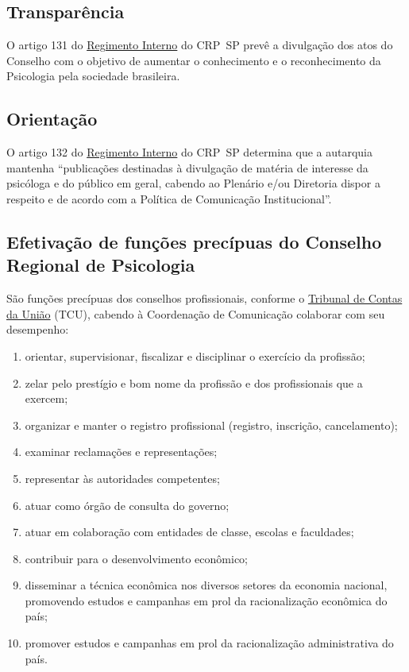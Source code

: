 \subsection{Transparência}

O artigo 131 do
\href{https://correio.crpsp.org.br/service/home/~/?auth=co&loc=pt_BR&id=4201&part=6}{{Regimento
			Interno}} do CRP~SP prevê a divulgação dos atos do Conselho com o
objetivo de aumentar o conhecimento e o reconhecimento da Psicologia
pela sociedade brasileira.

\subsection{Orientação}

O artigo 132 do
\href{https://correio.crpsp.org.br/service/home/~/?auth=co&loc=pt_BR&id=4201&part=6}{{Regimento
			Interno}} do CRP~SP determina que a autarquia mantenha ``publicações
destinadas à divulgação de matéria de interesse da psicóloga e do
público em geral, cabendo ao Plenário e/ou Diretoria dispor a respeito e
de acordo com a Política de Comunicação Institucional''.

\subsection{Efetivação de funções precípuas do Conselho Regional de
	Psicologia}

São funções precípuas dos conselhos profissionais, conforme o
\href{about:blank}{{Tribunal de Contas da União}} (TCU), cabendo à
Coordenação de Comunicação colaborar com seu desempenho:

\begin{enumerate}

	\item
	      orientar, supervisionar, fiscalizar e disciplinar o exercício da
	      profissão;
	\item
	      zelar pelo prestígio e bom nome da profissão e dos profissionais que a
	      exercem;
	\item
	      organizar e manter o registro profissional (registro, inscrição,
	      cancelamento);
	\item
	      examinar reclamações e representações;
	\item
	      representar às autoridades competentes;
	\item
	      atuar como órgão de consulta do governo;
	\item
	      atuar em colaboração com entidades de classe, escolas e faculdades;
	\item
	      contribuir para o desenvolvimento econômico;
	\item
	      disseminar a técnica econômica nos diversos setores da economia
	      nacional, promovendo estudos e campanhas em prol da racionalização
	      econômica do país;
	\item
	      promover estudos e campanhas em prol da racionalização administrativa
	      do país.
\end{enumerate}

